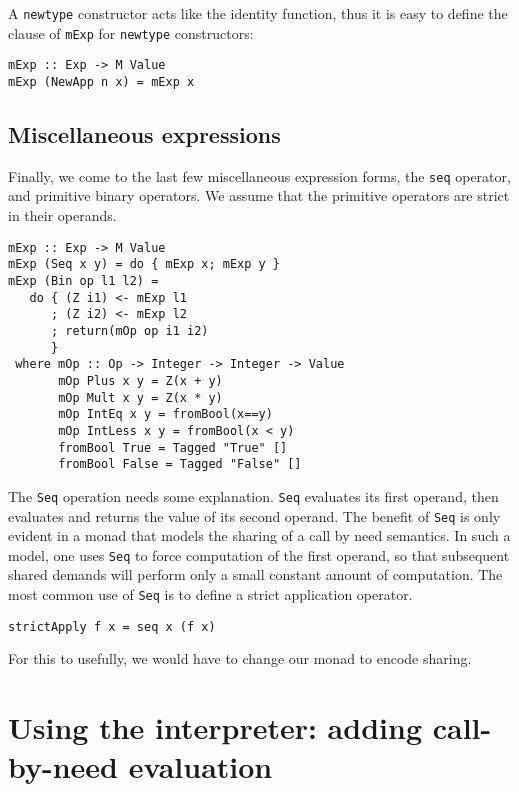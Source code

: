 \documentclass{entcs} \usepackage{entcsmacro}
\begin{document}
{A {\tt newtype} constructor acts like the identity function, thus it is easy to define
the clause of {\tt mExp} for {\tt newtype} constructors:

{\small
\begin{verbatim}
mExp :: Exp -> M Value
mExp (NewApp n x) = mExp x
\end{verbatim}
}

\subsection{Miscellaneous expressions}

Finally, we come to the last few miscellaneous expression forms, the {\tt seq} operator,
and primitive binary operators. We assume that the primitive operators are strict in their
operands.

{\small
\begin{verbatim}
mExp :: Exp -> M Value
mExp (Seq x y) = do { mExp x; mExp y }
mExp (Bin op l1 l2) =
   do { (Z i1) <- mExp l1
      ; (Z i2) <- mExp l2
      ; return(mOp op i1 i2)
      }
 where mOp :: Op -> Integer -> Integer -> Value
       mOp Plus x y = Z(x + y)
       mOp Mult x y = Z(x * y)
       mOp IntEq x y = fromBool(x==y)
       mOp IntLess x y = fromBool(x < y)
       fromBool True = Tagged "True" []
       fromBool False = Tagged "False" []
\end{verbatim}
}

The {\tt Seq} operation needs some explanation. {\tt Seq} evaluates
its first operand, then evaluates and returns the value of its second
operand. The benefit of {\tt Seq} is only evident in a monad that models
the sharing of a call by need semantics. In such a model, one uses {\tt Seq}
to force computation of the first operand, so that subsequent shared demands
will perform only a small constant amount of computation. The most common
use of {\tt Seq} is to define a strict application operator.

{\small
\begin{verbatim}
strictApply f x = seq x (f x)
\end{verbatim}
}

For this to usefully, we would have to change our monad to encode sharing.


\section{Using the interpreter: adding call-by-need evaluation}\label{callbyneed}

}
\end{document}
